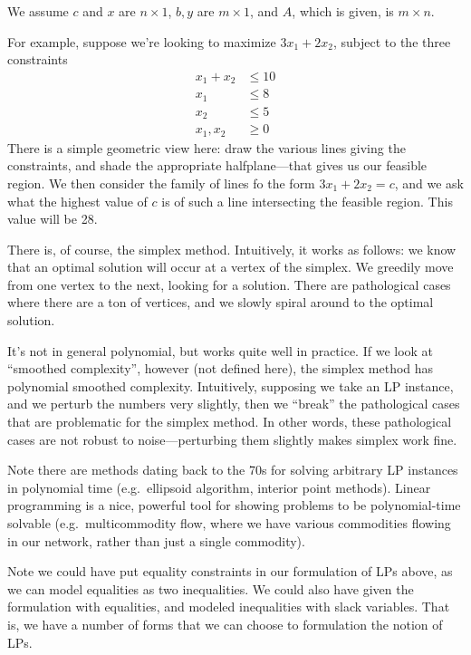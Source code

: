 \documentclass{article}
\begin{document}
We assume $c$ and $x$ are $n\times 1$, $b,y$ are $m\times 1$, and
$A$, which is given, is $m\times n$.

For example, suppose we're looking to maximize $3x_1 + 2x_2$, subject
to the three constraints
\begin{align*}
	x_1 + x_2 & \leq 10 \\
	x_1 & \leq 8 \\
	x_2 & \leq 5 \\
	x_1, x_2 &\geq 0
\end{align*}
There is a simple geometric view here: draw the various lines giving
the constraints, and shade the appropriate halfplane---that gives us our 
feasible region.
We then consider the family of lines fo the form $3x_1 + 2x_2 = c$, and we
ask what the highest value of $c$ is of such a line intersecting the feasible 
region.
This value will be 28.

There is, of course, the simplex method.
Intuitively, it works as follows: we know that an optimal solution will occur
at a vertex of the simplex. We greedily move from one vertex to the next, 
looking for a solution.
There are pathological cases where there are a ton of vertices, and we slowly
spiral around to the optimal solution.

It's not in general polynomial, but works quite well in practice.
If we look at ``smoothed complexity'', however (not defined here), the
simplex method has polynomial smoothed complexity.
Intuitively, supposing we take an LP instance, and we perturb the numbers
very slightly, then we ``break'' the pathological cases that are problematic
for the simplex method. In other words, these pathological cases are not
robust to noise---perturbing them slightly  makes simplex work fine.

Note there are methods dating back to the 70s for solving arbitrary LP 
instances in polynomial time (e.g.\ ellipsoid algorithm, interior
point methods).
Linear programming is a nice, powerful tool for showing problems
to be polynomial-time solvable (e.g.\ multicommodity flow, where we have 
various commodities flowing in our network, rather than just a single
commodity).

Note we could have put equality constraints in our formulation of LPs above,
as we can model equalities as two inequalities.
We could also have given the formulation with equalities, and modeled
inequalities with slack variables.
That is, we have a number of forms that we can choose to formulation
the notion of LPs.
\end{document}

